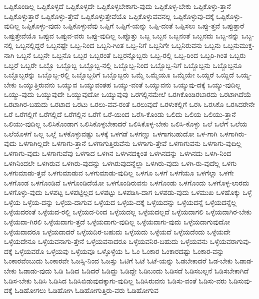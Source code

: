 {ಒಪ್ಪಿಕೊಂಡಿಲ್ಲ
ಒಪ್ಪಿಕೊಳ್ಳದೆ
ಒಪ್ಪಿಕೊಳ್ಳದೇ
ಒಪ್ಪಿಕೊಳ್ಳಬೇಕಾಗು-ವುದು
ಒಪ್ಪಿಕೊಳ್ಳ-ಬೇಕು
ಒಪ್ಪಿಕೊಳ್ಳು-ತ್ತಾನೆ
ಒಪ್ಪಿಕೊಳ್ಳುತ್ತಾರೆ
ಒಪ್ಪಿಕೊಳ್ಳು-ತ್ತೇವೆ
ಒಪ್ಪಿಕೊಳ್ಳುತ್ತೇವೆಯೊ
ಒಪ್ಪಿಕೊಳ್ಳುವವನಲ್ಲ
ಒಪ್ಪಿಕೊಳ್ಳುವು-ದಕ್ಕೆ
ಒಪ್ಪಿಕೊಳ್ಳು-ವುದಿಲ್ಲ
ಒಪ್ಪಿಕೊಳ್ಳು-ವುದು
ಒಪ್ಪಿಕೊಳ್ಳುವೆವು
ಒಪ್ಪಿಗೆ
ಒಪ್ಪಿಗೆ-ಯನ್ನು
ಒಪ್ಪಿ-ದಂತೆ
ಒಪ್ಪಿಸಲು
ಒಪ್ಪು-ತ್ತವೆ
ಒಪ್ಪುತ್ತಾರೆ
ಒಪ್ಪುತ್ತೇವೆಯೊ
ಒಪ್ಪುವ
ಒಪ್ಪುವ-ವರು
ಒಪ್ಪು-ವುದಿಲ್ಲ
ಒಪ್ಪೊತ್ತು
ಒಬ್ಬ
ಒಬ್ಬನ
ಒಬ್ಬನಂತೆ
ಒಬ್ಬನದು
ಒಬ್ಬ-ನನ್ನು
ಒಬ್ಬ-ನಲ್ಲಿ
ಒಬ್ಬನಲ್ಲಿದ್ದರೆ
ಒಬ್ಬನಷ್ಟೇ
ಒಬ್ಬ-ನಿಂದ
ಒಬ್ಬನಿ-ಗಿಂತ
ಒಬ್ಬ-ನಿಗೆ
ಒಬ್ಬನಿಗೇ
ಒಬ್ಬನಿರುವನು
ಒಬ್ಬನು
ಒಬ್ಬನುಮುಕ್ತ-ನಾಗಿ
ಒಬ್ಬನೆ
ಒಬ್ಬನೇ
ಒಬ್ಬನೊ
ಒಬ್ಬರ
ಒಬ್ಬರಂತೆ
ಒಬ್ಬರನ್ನೊಬ್ಬರು
ಒಬ್ಬ-ರಲ್ಲಿ
ಒಬ್ಬ-ರಿಂದ
ಒಬ್ಬರಿ-ಗಿಂತ
ಒಬ್ಬರು
ಒಬ್ಬರೆ
ಒಬ್ಬರೇ
ಒಬ್ಬೊ
ಒಬ್ಬೊಬ್ಬ
ಒಬ್ಬೊಬ್ಬ-ನಲ್ಲಿ
ಒಬ್ಬೊಬ್ಬ-ನಿಂದ
ಒಬ್ಬೊಬ್ಬ-ನಿಗೆ
ಒಬ್ಬೊಬ್ಬನು
ಒಬ್ಬೊಬ್ಬನೂ
ಒಬ್ಬೊಬ್ಬರನ್ನು
ಒಬ್ಬೊಬ್ಬ-ರಲ್ಲಿ
ಒಬ್ಬೊಬ್ಬರಿಗೆ
ಒಬ್ಬೊಬ್ಬರು
ಒಮ್ಮೆ
ಒಮ್ಮೆಯೂ
ಒಮ್ಮೆಯೇ
ಒಯ್ದರೆ
ಒಯ್ದಿದೆ
ಒಯ್ಯ-ಬೇಕು
ಒಯ್ಯುತ್ತಿರುವನು
ಒಯ್ಯುವ
ಒಯ್ಯುವಂತಹ
ಒಯ್ಯು-ವಂತೆ
ಒಯ್ಯುವನು
ಒಯ್ಯುವು-ದಕ್ಕೆ
ಒಯ್ಯು-ವುದಿಲ್ಲ
ಒಯ್ಯು-ವುದು
ಒಯ್ಯುವುದೇ
ಒಯ್ಯುವುದೋ
ಒಯ್ಯುವುವು
ಒರಗಲ್ಲಿನಮೇಲೆ
ಒರಗಿಕೊಂಡಿರಬಾರದು
ಒರಟಾಗಿದೆಯೆ
ಒರಟಾಗಿರ-ಬಹುದು
ಒರಟಾದ
ಒರಟು
ಒರಲು-ವವ-ರಂತೆ
ಒರಲುವುದೆ
ಒರಳುಕಲ್ಲಿಗೆ
ಒರಸಿ
ಒರಸಿಕೊ
ಒರಸಿದರೇನೇ
ಒರೆ
ಒರೆಗಲ್ಲಿಗೆ
ಒರೆಗಲ್ಲಿದೆ
ಒರೆಗಲ್ಲಿನ
ಒರೆಗೆ
ಒರೆ-ಯಿಂದ
ಒರೆಸಿ-ಕೊಂಡು
ಒಲಿದು
ಒಲಿಯ
ಒಲಿಯು-ತ್ತಾನೆ
ಒಲಿಯು-ವುದಿಲ್ಲ
ಒಲಿಸಿಕೊಂಡಾಗ
ಒಲಿಸಿಕೊಳ್ಳಬೇಕಾದರೆ
ಒಲಿಸಿಕೊಳ್ಳ-ಬೇಕು
ಒಲಿಸಿ-ಕೊಳ್ಳು
ಒಲೆ
ಒಲೆಗೆ
ಒಲೆಯ
ಒಲೆಯೊಳಗೆ
ಒಲ್ಲ
ಒಲ್ಲೆ
ಒಳಕೊಳ್ಳುವಷ್ಟು
ಒಳಕ್ಕೆ
ಒಳಗಡೆ
ಒಳಗಣ್ಣು
ಒಳಗಾಗಬಹುದೋ
ಒಳ-ಗಾಗಿ
ಒಳಗಾಗಿರು-ವುದು
ಒಳಗಾಗಿಲ್ಲದೇ
ಒಳಗಾಗು-ತ್ತಾನೆ
ಒಳಗಾಗುತ್ತಿರುವೆನು
ಒಳಗಾಗು-ತ್ತೇವೆ
ಒಳಗಾಗುವನು
ಒಳಗಾಗು-ವುದಿಲ್ಲ
ಒಳಗಾಗು-ವುದು
ಒಳಗಾಗುವೆವು
ಒಳಗಾದ
ಒಳಗಿನ
ಒಳಗಿನದಕ್ಕಿಂತ
ಒಳಗಿನದನ್ನು
ಒಳಗಿನದು
ಒಳಗಿ-ನಿಂದ
ಒಳಗಿನಿಂದಲೇ
ಒಳಗಿರುವ
ಒಳಗಿರು-ವುದನ್ನು
ಒಳಗಿರುವುದನ್ನೆಲ್ಲಾ
ಒಳಗಿರು-ವುದು
ಒಳಗಿ-ರು-ವುದೆಲ್ಲ
ಒಳಗು
ಒಳಗುಮಾಡು-ತ್ತವೆ
ಒಳಗುಮಾಡುವ
ಒಳಗುಮಾಡು-ವುದಿಲ್ಲ
ಒಳಗೂ
ಒಳಗೆ
ಒಳಗೆಯೂ
ಒಳಗೆಲ್ಲಾ
ಒಳಗೇ
ಒಳಗೊಂಡ
ಒಳಗೊಂಡಿದೆ
ಒಳಗೊಂಡಿದೆಯೋ
ಒಳಗೊಂಡಿರುವನು
ಒಳಗೊಂಡು
ಒಳಗೊಂದು
ಒಳಗೊಳ್ಳ-ಲಾರದು
ಒಳಗೊಳ್ಳು-ವುದು
ಒಳಪಟ್ಟ
ಒಳಪಟ್ಟಿಲ್ಲದ
ಒಳಪಟ್ಟು
ಒಳಪಡಿಸಿ-ದಾಗ
ಒಳಪಡು-ವುದು
ಒಳಮುಖ
ಒಳಹೊಕ್ಕು
ಒಳ್ಳೆ
ಒಳ್ಳೆಯ
ಒಳ್ಳೆಯ-ದನ್ನು
ಒಳ್ಳೆಯ-ದಾಗುವ
ಒಳ್ಳೆಯದ
ಒಳ್ಳೆಯ-ದಕ್ಕೆ
ಒಳ್ಳೆಯದನ್ನು
ಒಳ್ಳೆಯದನ್ನೆ
ಒಳ್ಳೆಯದನ್ನೆಲ್ಲ
ಒಳ್ಳೆಯದರಂತೆ
ಒಳ್ಳೆಯದ-ರಲ್ಲಿ
ಒಳ್ಳೆಯದ-ರಿಂದ
ಒಳ್ಳೆಯದಲ್ಲ
ಒಳ್ಳೆಯದಲ್ಲದೆ
ಒಳ್ಳೆಯದಾಗಲಿ
ಒಳ್ಳೆಯದಾಗಿರ-ಬೇಕು
ಒಳ್ಳೆಯದಾ-ಗಿರಲಿ
ಒಳ್ಳೆಯದಾಗು-ತ್ತದೆ
ಒಳ್ಳೆಯದಾಗು-ವುದಿಲ್ಲ
ಒಳ್ಳೆಯದಾಗು-ವುದು
ಒಳ್ಳೆಯದಾಗುವುದೋ
ಒಳ್ಳೆಯದಾದರೂ
ಒಳ್ಳೆಯದಾದರೆ
ಒಳ್ಳೆಯದಿರ-ಬಹುದು
ಒಳ್ಳೆಯದು
ಒಳ್ಳೆಯದೆ
ಒಳ್ಳೆಯದೆಂದು
ಒಳ್ಳೆಯದೇ
ಒಳ್ಳೆಯದೇನೂ
ಒಳ್ಳೆಯವನಾಗು-ತ್ತೇನೆ
ಒಳ್ಳೆಯವನಾದರೂ
ಒಳ್ಳೆಯವನಿರ-ಬಹುದು
ಒಳ್ಳೆಯವನು
ಒಳ್ಳೆಯವರಾಗುವು-ದಕ್ಕೆ
ಒಳ್ಳೆಯವರೊ
ಒಳ್ಳೆಯವು
ಒಳ್ಳೆಯವೂ
ಒಳ್ಳೊಳ್ಳೆಯ
ಓ
ಓಂ
ಓಂಕಾರ
ಓಂಕಾರದಷ್ಟು
ಓಂಕಾರ-ವನ್ನು
ಓಂಕಾರವೆಂಬುದು
ಓಂಕಾರವೇ
ಓಜಸ್ಸಿ-ನಿಂದ
ಓಜಸ್ಸು
ಓಟಿಗೆ
ಓಟೆ
ಓಟೆ-ಯನ್ನು
ಓಡಬೇಕಾದರೆ
ಓಡ-ಬೇಕು
ಓಡಾಡ-ಬೇಕು
ಓಡಾಡು-ವುದು
ಓಡಿ
ಓಡಿದ
ಓಡಿದರೆ
ಓಡಿದ್ದು
ಓಡಿದ್ದೇ
ಓಡಿಬಂದು
ಓಡಿಸದೆ
ಓಡಿಸಬಲ್ಲನೆ
ಓಡಿಸಬೇಕಾಗಿದೆ
ಓಡಿಸ-ಬೇಕು
ಓಡಿಸಿ
ಓಡಿಸಿದ
ಓಡಿಸಿಬಿಡುವುದಕ್ಕಾಗು-ವುದಿಲ್ಲ
ಓಡಿಸಿರುವನು
ಓಡಿಸು-ವಂತೆ
ಓಡಿಸು-ವರು
ಓಡಿಸುವು-ದಕ್ಕೆ
ಓಡಿಹೋಗಲು
ಓಡಿಹೋಗಿ
ಓಡಿಹೋಗುತ್ತಿರು-ವರು
ಓಡಿಹೋಗುವ
}
